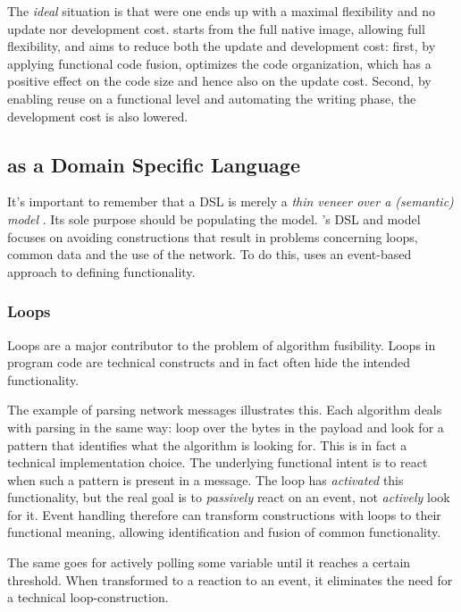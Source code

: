 \documentclass[conference]{IEEEtran}
\begin{document}
The \emph{ideal} situation is that were one ends up with a maximal flexibility
and no update nor development cost. \NAME starts from the full native image,
allowing full flexibility, and aims to reduce both the update and development
cost: first, by applying functional code fusion, \NAME optimizes the code
organization, which has a positive effect on the code size and hence also on
the update cost. Second, by enabling reuse on a functional level and automating
the writing phase, the development cost is also lowered.

\subsection{\NAME as a Domain Specific Language}
\label{dsl-design}

It's important to remember that a DSL is merely a \emph{thin veneer over a
(semantic) model} \cite{fowler2010domain}. Its sole purpose should be
populating the model. \NAME's DSL and model focuses on avoiding constructions
that result in problems concerning loops, common data and the use of the
network. To do this, \NAME uses an event-based approach to defining
functionality.

\subsubsection{Loops}

Loops are a major contributor to the problem of algorithm fusibility. Loops in
program code are technical constructs and in fact often hide the intended
functionality.

The example of parsing network messages illustrates this. Each algorithm deals
with parsing in the same way: loop over the bytes in the payload and look for a
pattern that identifies what the algorithm is looking for. This is in fact a
technical implementation choice. The underlying functional intent is to react
when such a pattern is present in a message. The loop has \emph{activated} this
functionality, but the real goal is to \emph{passively} react on an event, not
\emph{actively} look for it. Event handling therefore can transform
constructions with loops to their functional meaning, allowing identification
and fusion of common functionality.

The same goes for actively polling some variable until it reaches a certain
threshold. When transformed to a reaction to an event, it eliminates the need
for a technical loop-construction.
\end{document}
